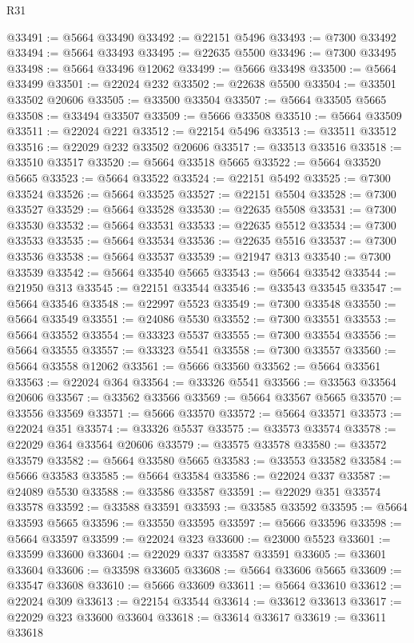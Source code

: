 \begin{lexlean}{R31}
\begin{coremodule}
@33491 := @5664 @33490
@33492 := @22151 @5496
@33493 := @7300 @33492
@33494 := @5664 @33493
@33495 := @22635 @5500
@33496 := @7300 @33495
@33498 := @5664 @33496 @12062
@33499 := @5666 @33498
@33500 := @5664 @33499
@33501 := @22024 @232
@33502 := @22638 @5500
@33504 := @33501 @33502 @20606
@33505 := @33500 @33504
@33507 := @5664 @33505 @5665
@33508 := @33494 @33507
@33509 := @5666 @33508
@33510 := @5664 @33509
@33511 := @22024 @221
@33512 := @22154 @5496
@33513 := @33511 @33512
@33516 := @22029 @232 @33502 @20606
@33517 := @33513 @33516
@33518 := @33510 @33517
@33520 := @5664 @33518 @5665
@33522 := @5664 @33520 @5665
@33523 := @5664 @33522
@33524 := @22151 @5492
@33525 := @7300 @33524
@33526 := @5664 @33525
@33527 := @22151 @5504
@33528 := @7300 @33527
@33529 := @5664 @33528
@33530 := @22635 @5508
@33531 := @7300 @33530
@33532 := @5664 @33531
@33533 := @22635 @5512
@33534 := @7300 @33533
@33535 := @5664 @33534
@33536 := @22635 @5516
@33537 := @7300 @33536
@33538 := @5664 @33537
@33539 := @21947 @313
@33540 := @7300 @33539
@33542 := @5664 @33540 @5665
@33543 := @5664 @33542
@33544 := @21950 @313
@33545 := @22151 @33544
@33546 := @33543 @33545
@33547 := @5664 @33546
@33548 := @22997 @5523
@33549 := @7300 @33548
@33550 := @5664 @33549
@33551 := @24086 @5530
@33552 := @7300 @33551
@33553 := @5664 @33552
@33554 := @33323 @5537
@33555 := @7300 @33554
@33556 := @5664 @33555
@33557 := @33323 @5541
@33558 := @7300 @33557
@33560 := @5664 @33558 @12062
@33561 := @5666 @33560
@33562 := @5664 @33561
@33563 := @22024 @364
@33564 := @33326 @5541
@33566 := @33563 @33564 @20606
@33567 := @33562 @33566
@33569 := @5664 @33567 @5665
@33570 := @33556 @33569
@33571 := @5666 @33570
@33572 := @5664 @33571
@33573 := @22024 @351
@33574 := @33326 @5537
@33575 := @33573 @33574
@33578 := @22029 @364 @33564 @20606
@33579 := @33575 @33578
@33580 := @33572 @33579
@33582 := @5664 @33580 @5665
@33583 := @33553 @33582
@33584 := @5666 @33583
@33585 := @5664 @33584
@33586 := @22024 @337
@33587 := @24089 @5530
@33588 := @33586 @33587
@33591 := @22029 @351 @33574 @33578
@33592 := @33588 @33591
@33593 := @33585 @33592
@33595 := @5664 @33593 @5665
@33596 := @33550 @33595
@33597 := @5666 @33596
@33598 := @5664 @33597
@33599 := @22024 @323
@33600 := @23000 @5523
@33601 := @33599 @33600
@33604 := @22029 @337 @33587 @33591
@33605 := @33601 @33604
@33606 := @33598 @33605
@33608 := @5664 @33606 @5665
@33609 := @33547 @33608
@33610 := @5666 @33609
@33611 := @5664 @33610
@33612 := @22024 @309
@33613 := @22154 @33544
@33614 := @33612 @33613
@33617 := @22029 @323 @33600 @33604
@33618 := @33614 @33617
@33619 := @33611 @33618

\end{coremodule}
\end{lexlean}
